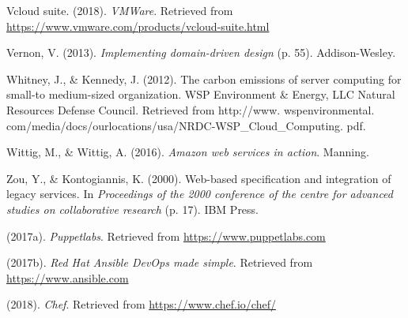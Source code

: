 \documentclass[12pt,twoside]{reedthesis}
\begin{document}
\leavevmode\hypertarget{ref-Cap3_6_mT}{}%
Vcloud suite. (2018). \emph{VMWare}. Retrieved from \url{https://www.vmware.com/products/vcloud-suite.html}

\leavevmode\hypertarget{ref-Cap4_ImplementingPlantillaDibujo}{}%
Vernon, V. (2013). \emph{Implementing domain-driven design} (p. 55). Addison-Wesley.

\leavevmode\hypertarget{ref-Cap1_1_PdP}{}%
Whitney, J., \& Kennedy, J. (2012). The carbon emissions of server computing for small-to medium-sized organization. WSP Environment \& Energy, LLC Natural Resources Defense Council. Retrieved from http://www. wspenvironmental. com/media/docs/ourlocations/usa/NRDC-WSP\_Cloud\_Computing. pdf.

\leavevmode\hypertarget{ref-Cap3_7mT}{}%
Wittig, M., \& Wittig, A. (2016). \emph{Amazon web services in action}. Manning.

\leavevmode\hypertarget{ref-Cap1_WebBased}{}%
Zou, Y., \& Kontogiannis, K. (2000). Web-based specification and integration of legacy services. In \emph{Proceedings of the 2000 conference of the centre for advanced studies on collaborative research} (p. 17). IBM Press.

\leavevmode\hypertarget{ref-Cap3_Puppet}{}%
(2017a). \emph{Puppetlabs}. Retrieved from \url{https://www.puppetlabs.com}

\leavevmode\hypertarget{ref-Cap3_ansible}{}%
(2017b). \emph{Red Hat Ansible DevOps made simple}. Retrieved from \url{https://www.ansible.com}

\leavevmode\hypertarget{ref-Cap3_9mT}{}%
(2018). \emph{Chef}. Retrieved from \url{https://www.chef.io/chef/}


\end{document}
